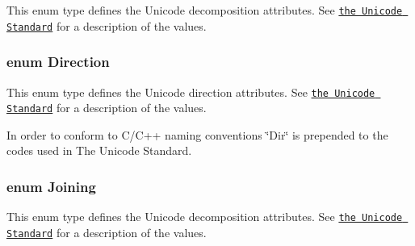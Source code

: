 This enum type defines the Unicode decomposition attributes. See \href{http://www.unicode.org}{\tt the Unicode Standard} for a description of the values. \hypertarget{class_q_char_a224b9163917ac32fc95a60d8c1eec3aa}{
\subsubsection[{Direction}]{\setlength{\rightskip}{0pt plus 5cm}enum {\bf Direction}}}\label{class_q_char_a224b9163917ac32fc95a60d8c1eec3aa}
This enum type defines the Unicode direction attributes. See \href{http://www.unicode.org}{\tt the Unicode Standard} for a description of the values.

In order to conform to C/\-C++ naming conventions \char`\"{}\-Dir\char`\"{} is prepended to the codes used in The Unicode Standard. \hypertarget{class_q_char_a7cb8fbdfaf179409190a2321ae0a10ed}{
\subsubsection[{Joining}]{\setlength{\rightskip}{0pt plus 5cm}enum {\bf Joining}}}\label{class_q_char_a7cb8fbdfaf179409190a2321ae0a10ed}
This enum type defines the Unicode decomposition attributes. See \href{http://www.unicode.org}{\tt the Unicode Standard} for a description of the values. 

